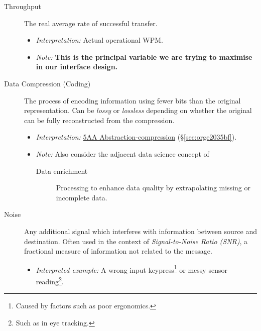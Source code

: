 \documentclass[logo,bsc,singlespacing,parskip]{infthesis}
\begin{document}
{\begin{mdframed}
\begin{description}
\item[{Throughput}] The real average rate of successful transfer.
\begin{itemize}
\item \emph{Interpretation:} Actual operational WPM.
\item \emph{Note:} \textbf{This is the principal variable we are trying to maximise in our interface design.}
\end{itemize}
\end{description}
\end{mdframed}

\begin{mdframed}
\begin{description}
\item[{Data Compression (Coding)}] The process of encoding information using fewer bits than the original representation. Can be \emph{lossy} or \emph{lossless} depending on whether the original can be fully reconstructed from the compression.
\begin{itemize}
\item \emph{Interpretation:} \hyperref[sec:orge2035bf]{5AA Abstraction-compression} (\S \ref{sec:orge2035bf}).
\item \emph{Note:} Also consider the adjacent data science concept of
\begin{description}
\item[{Data enrichment}] Processing to enhance data quality by extrapolating missing or incomplete data.
\end{description}
\end{itemize}
\end{description}
\end{mdframed}

\begin{mdframed}
\begin{description}
\item[{Noise\label{noise}}] Any additional signal which interferes with information between source and destination.
Often used in the context of \emph{Signal-to-Noise Ratio (SNR)}, a fractional measure of information not related to the message.
\begin{itemize}
\item \emph{Interpreted example:} A wrong input keypress\footnote{Caused by factors such as poor ergonomics.} or messy sensor reading\footnote{Such as in eye tracking.}.
\end{itemize}
\end{description}
\end{mdframed}

}
\end{document}
